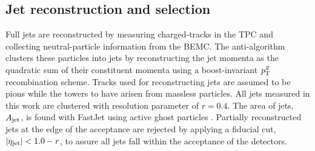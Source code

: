 \subsection{Jet reconstruction and selection} \label{sect:JetReco}
Full jets are reconstructed by measuring charged-tracks in the TPC and collecting neutral-particle information from the BEMC.  The anti-\kt algorithm 
clusters these particles into jets by reconstructing the jet momenta as the quadratic sum of their constituent momenta using a boost-invariant $\it{p}^{2}_{\rm T}$ recombination scheme.  Tracks used for reconstructing jets are assumed to be pions while the towers to have arisen from massless particles. All jets measured in this work are clustered with resolution parameter of $r=0.4$. The area of jets, $A_{\rm jet}$, is found with FastJet using active ghost particles \cite{Cacciari:2008gn}.  Partially reconstructed jets at the edge of the acceptance are rejected by applying a fiducial cut, $|\eta_{\rm jet}| < 1.0 - r$, to assure all jets fall within the acceptance of the detectors. 


